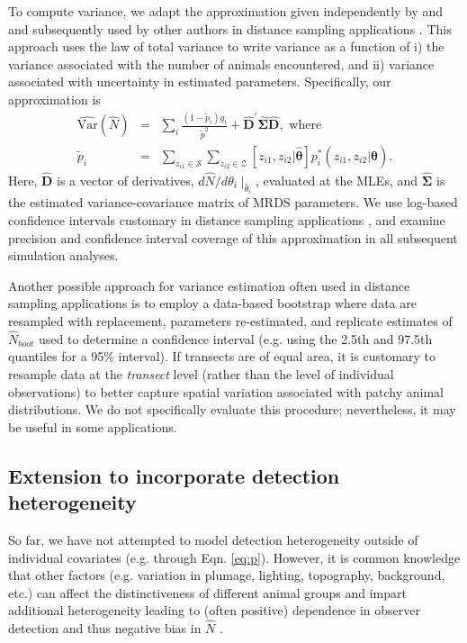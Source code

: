 \documentclass[aoas,preprint]{imsart}
\numberwithin{equation}{section}
\theoremstyle{plain}
\begin{document}
To compute variance, we adapt the approximation given independently by \citet{Huggins1989,Huggins1990} and \citet{Alho1990} and subsequently used by other authors in distance sampling applications \citep[e.g.][]{BorchersEtAl2006}.
This approach uses the law of total variance to write variance as a function of i) the variance associated with the number of animals encountered, and ii) variance associated with uncertainty in estimated parameters.  Specifically, our approximation is
\begin{eqnarray*}
  \hat{\text{Var}}(\hat{N}) & = & \sum_i \frac{(1-\tilde{p}_i)g_i}{\tilde{p}^2}+\hat{\textbf{D}}^\prime \hat{\boldsymbol{\Sigma}}\hat{\textbf{D}}, \text{ where} \\
  \tilde{p}_i & = & \sum_{z_{i1}\in \mathcal{S}} \sum_{z_{i2} \in \mathcal{Z}} [{z}_{i1},{z}_{i2} | \hat{\boldsymbol{\theta}}]p_i^*(z_{i1},z_{i2}|\hat{\boldsymbol{\theta}}).
\end{eqnarray*}
Here, $\hat{\textbf{D}}$ is a vector of derivatives, $d \hat{N} / d \theta_i \mid_{\hat{\theta}_i}$, evaluated at the MLEs, and $\hat{\boldsymbol{\Sigma}}$ is the estimated variance-covariance matrix of MRDS parameters. We use log-based confidence intervals \citep[][pg. 212]{BurnhamEtAl1987} customary in distance sampling applications \citep{BucklandEtAl2001}, and examine precision and confidence interval coverage of this approximation in all subsequent simulation analyses.

Another possible approach for variance estimation often used in distance sampling applications is to employ a data-based bootstrap where data are resampled with replacement, parameters re-estimated, and replicate estimates of $\hat{N}_{boot}$ used to determine a confidence interval (e.g. using the 2.5th and 97.5th quantiles for a 95\% interval).  If transects are of equal area, it is customary to resample data at the \textit{transect} level (rather than the level of individual observations) to better capture spatial variation associated with patchy animal distributions.  We do not specifically evaluate this procedure; nevertheless, it may be useful in some applications.


\subsection{Extension to incorporate detection heterogeneity}
\label{section:het}

So far, we have not attempted to model detection heterogeneity outside of individual covariates (e.g. through Eqn. \ref{eq:p}).  However, it is common knowledge that other factors (e.g. variation in plumage, lighting, topography, background, etc.) can affect the distinctiveness of different animal groups and impart additional heterogeneity leading to (often positive) dependence in observer detection and thus negative bias in $\hat{N}$ \citep{LaakeBorchers2004,BucklandEtAl2010,BurtEtAl2014}.
\end{document}
